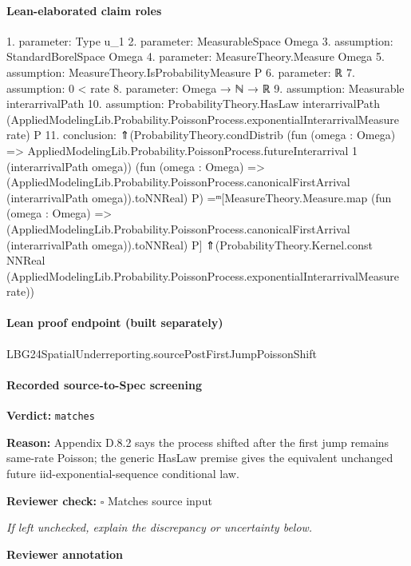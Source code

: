 \documentclass[10pt]{article}
\newcommand{\reviewerbox}{%
  \par\noindent\fbox{\parbox{0.96\linewidth}{\rule{0pt}{0.38in}}}\par
}
\newcommand{\reviewmatch}[1]{%
  \par\noindent\textbf{Reviewer check:} $\square$\; #1\par
  \noindent\emph{If left unchecked, explain the discrepancy or uncertainty below.}\par
}
\begin{document}
\paragraph{Lean-elaborated claim roles}\begin{ReviewVerbatim}
1. parameter: Type u_1
2. parameter: MeasurableSpace Omega
3. assumption: StandardBorelSpace Omega
4. parameter: MeasureTheory.Measure Omega
5. assumption: MeasureTheory.IsProbabilityMeasure P
6. parameter: ℝ
7. assumption: 0 < rate
8. parameter: Omega → ℕ → ℝ
9. assumption: Measurable interarrivalPath
10. assumption: ProbabilityTheory.HasLaw interarrivalPath
  (AppliedModelingLib.Probability.PoissonProcess.exponentialInterarrivalMeasure rate) P
11. conclusion: ⇑(ProbabilityTheory.condDistrib
      (fun (omega : Omega) =>
        AppliedModelingLib.Probability.PoissonProcess.futureInterarrival 1 (interarrivalPath omega))
      (fun (omega : Omega) =>
        (AppliedModelingLib.Probability.PoissonProcess.canonicalFirstArrival (interarrivalPath omega)).toNNReal)
      P) =ᵐ[MeasureTheory.Measure.map
    (fun (omega : Omega) =>
      (AppliedModelingLib.Probability.PoissonProcess.canonicalFirstArrival (interarrivalPath omega)).toNNReal)
    P]
  ⇑(ProbabilityTheory.Kernel.const NNReal
      (AppliedModelingLib.Probability.PoissonProcess.exponentialInterarrivalMeasure rate))
\end{ReviewVerbatim}

\paragraph{Lean proof endpoint (built separately)}\begin{ReviewVerbatim}
LBG24SpatialUnderreporting.sourcePostFirstJumpPoissonShift
\end{ReviewVerbatim}

\paragraph{Recorded source-to-Spec screening}
\textbf{Verdict:} \texttt{matches}
\\
{\raggedright
\textbf{Reason:} Appendix D.\allowbreak{}8.\allowbreak{}2 says the process shifted after the first jump remains same-\allowbreak{}rate Poisson;\allowbreak{} the generic HasLaw premise gives the equivalent unchanged future iid-\allowbreak{}exponential-\allowbreak{}sequence conditional law.\allowbreak{}
\par}
\reviewmatch{Matches source input}
\noindent\textbf{Reviewer annotation}\par
\reviewerbox
\end{document}
